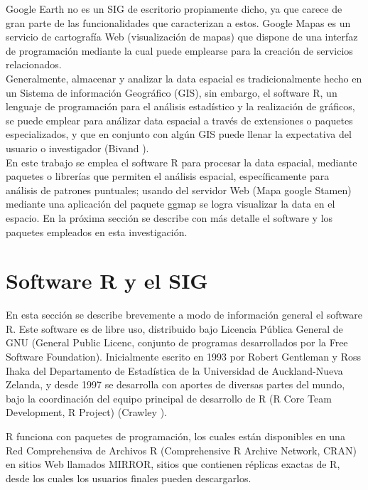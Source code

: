 \documentclass[12pt]{report}
\begin{document}
		    Google Earth no es un SIG de escritorio propiamente dicho, ya que carece de gran parte de las funcionalidades que caracterizan a estos. 	Google Mapas es un servicio de cartografía Web (visualización de mapas) que dispone de una interfaz de programación mediante la cual puede emplearse para la creación de servicios relacionados. \\
			
			
			Generalmente, almacenar y analizar la data espacial es tradicionalmente hecho en un Sistema de información Geográfico (GIS), sin embargo, el software R, un lenguaje de programación para el análisis estadístico y la realización de gráficos, se puede emplear para  análizar data espacial a través   de extensiones o paquetes especializados, y que en conjunto con algún GIS puede llenar la expectativa del usuario o investigador (Bivand  \cite{Roger}).\\
			
			
			
			En este trabajo se emplea el software R para procesar la data espacial, mediante paquetes o librerías que permiten el análisis espacial, específicamente para análisis de patrones puntuales;  usando del servidor Web (Mapa google Stamen) mediante  una aplicación del paquete ggmap  se logra visualizar la data en el espacio. En la próxima sección se describe con más detalle el software y los paquetes empleados en esta investigación.\\
			
			
			
			\section{Software R y el SIG}{\label{R1} }
			
			
			En esta sección se describe brevemente  a modo de información general el software R. Este software es de libre uso,  distribuido bajo Licencia Pública General de GNU (General Public Licenc, conjunto de programas desarrollados por la Free Software Foundation). Inicialmente escrito en 1993 por Robert Gentleman y Ross Ihaka del Departamento de Estadística de la Universidad de Auckland-Nueva Zelanda, y desde 1997 se desarrolla con aportes de diversas partes del mundo, bajo la coordinación del equipo principal de desarrollo de R (R Core Team Development,  R Project) (Crawley  \cite{Michael}).  %
			
			
			R funciona con paquetes de programación, los cuales están disponibles en una Red Comprehensiva de Archivos R (Comprehensive R Archive Network, CRAN) en sitios Web llamados MIRROR,  sitios que contienen réplicas exactas de R,  desde los cuales los usuarios finales pueden descargarlos. 
			
\end{document}
